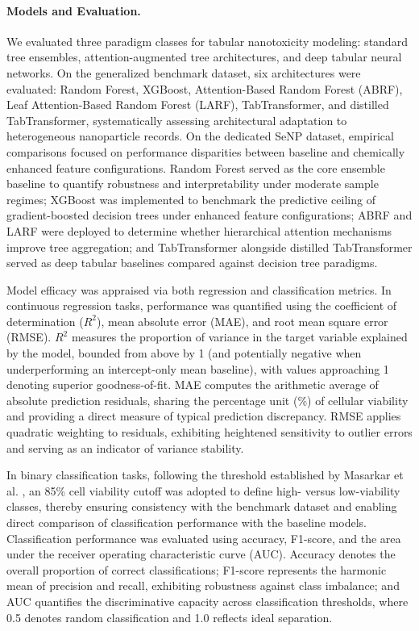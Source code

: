 \paragraph{Models and Evaluation.}
We evaluated three paradigm classes for tabular nanotoxicity modeling: standard tree ensembles, attention-augmented tree architectures, and deep tabular neural networks. On the generalized benchmark dataset, six architectures were evaluated: Random Forest, XGBoost, Attention-Based Random Forest (ABRF), Leaf Attention-Based Random Forest (LARF), TabTransformer, and distilled TabTransformer, systematically assessing architectural adaptation to heterogeneous nanoparticle records. On the dedicated SeNP dataset, empirical comparisons focused on performance disparities between baseline and chemically enhanced feature configurations. Random Forest served as the core ensemble baseline to quantify robustness and interpretability under moderate sample regimes; XGBoost was implemented to benchmark the predictive ceiling of gradient-boosted decision trees under enhanced feature configurations; ABRF and LARF were deployed to determine whether hierarchical attention mechanisms improve tree aggregation; and TabTransformer alongside distilled TabTransformer served as deep tabular baselines compared against decision tree paradigms.

Model efficacy was appraised via both regression and classification metrics. In continuous regression tasks, performance was quantified using the coefficient of determination ($R^2$), mean absolute error (MAE), and root mean square error (RMSE). $R^2$ measures the proportion of variance in the target variable explained by the model, bounded from above by 1 (and potentially negative when underperforming an intercept-only mean baseline), with values approaching 1 denoting superior goodness-of-fit. MAE computes the arithmetic average of absolute prediction residuals, sharing the percentage unit (\%) of cellular viability and providing a direct measure of typical prediction discrepancy. RMSE applies quadratic weighting to residuals, exhibiting heightened sensitivity to outlier errors and serving as an indicator of variance stability.

In binary classification tasks, following the threshold established by Masarkar et al. \cite{masarkar2024}, an 85\% cell viability cutoff was adopted to define high- versus low-viability classes, thereby ensuring consistency with the benchmark dataset and enabling direct comparison of classification performance with the baseline models. Classification performance was evaluated using accuracy, F1-score, and the area under the receiver operating characteristic curve (AUC). Accuracy denotes the overall proportion of correct classifications; F1-score represents the harmonic mean of precision and recall, exhibiting robustness against class imbalance; and AUC quantifies the discriminative capacity across classification thresholds, where 0.5 denotes random classification and 1.0 reflects ideal separation.

